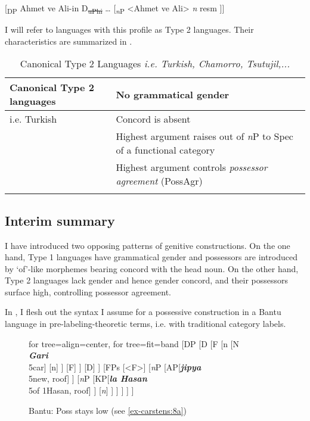 \documentclass[output=paper
,modfonts
,nonflat]{langsci/langscibook}
\begin{document}
\begin{exe}
	{[}\textsubscript{DP} Ahmet ve Ali-in D\textsubscript{\sout{uPhi}} … {[}\textsubscript{\textit{n}P} <Ahmet ve Ali>  \textit{n} resm {]}{]}
\end{exe}
I will refer to languages with this profile as Type 2 languages. Their characteristics are summarized in .

\begin{table}
	\caption{Canonical Type 2 Languages \textit{i.e. Turkish, Chamorro, Tsutujil,...}}
	\label{tab-carstens:2}
	\begin{tabularx}{\textwidth}{lX}
		\lsptoprule
		Canonical Type 2 languages &  No grammatical gender\\\midrule
		i.e. Turkish  & Concord is absent\\
		& Highest argument raises out of \textit{n}P to Spec of a functional category\\
		& Highest argument controls \textit{possessor agreement} (PossAgr)\\
		\lspbottomrule
	\end{tabularx}
\end{table}

\subsection{Interim summary} \label{sec-carstens:2.3}

I have introduced two opposing patterns of genitive constructions. On the one hand, Type 1 languages have grammatical gender and possessors are introduced by ‘of’-like morphemes bearing concord with the head noun. On the other hand, Type 2 languages lack gender and hence gender concord, and their possessors surface high, controlling possessor agreement. 

In , I flesh out the syntax I assume for a possessive construction in a Bantu language in pre-labeling-theoretic terms, i.e. with traditional category labels.

	\begin{figure}[p]\small
			\caption{Bantu: Poss stays low (see \ref{ex-carstens:8a})\label{fig:carstens:Bantulow}}
			\begin{forest} for tree={align=center}, for tree={fit=band}
				[DP 
				[D	
				[F
				[n
				[N\\ \textit{\textbf{Gari}}\\5car]
				[n] ]
				[F] ] 
				[D] ]
				[FPs
				[<F>]
				[\textit{n}P
				[AP[\textit{\textbf{jipya}}\\5new, roof] ]
				[\textit{n}P
				[KP[\textit{\textbf{la Hasan}}\\5of 1Hasan, roof] ]
				[\textit{n}\textquotesingle
				[<\textit{n}>]
				[NP[<N>, roof] ]
				] ] ] ] ]
		\end{forest}
	\end{figure}  
\end{document}
